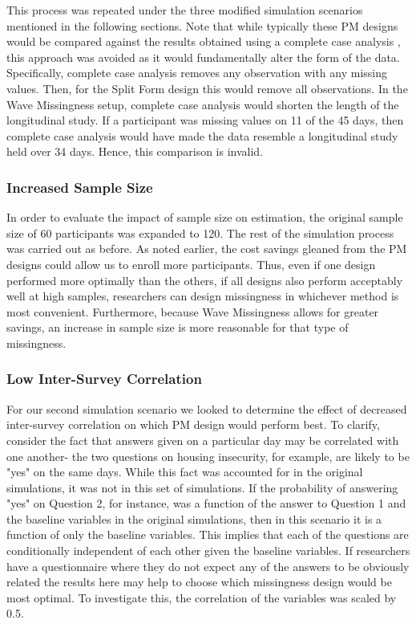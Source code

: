 \documentclass{svjour3}\usepackage[]{graphicx}\usepackage[]{color}
\begin{document}
This process was repeated under the three modified simulation scenarios mentioned in the following sections. Note that while typically these PM designs would be compared against the results obtained using a complete case analysis \citep{rhemtulla2016asymptotic}, this approach was avoided as it would fundamentally alter the form of the data. Specifically, complete case analysis removes any observation with any missing values. Then, for the Split Form design this would remove all observations. In the Wave Missingness setup, complete case analysis would shorten the length of the longitudinal study. If a participant was missing values on 11 of the 45 days, then complete case analysis would have made the data resemble a longitudinal study held over 34 days. Hence, this comparison is invalid. \par

\subsubsection{Increased Sample Size}
In order to evaluate the impact of sample size on estimation, the original sample size of 60 participants was expanded to 120. The rest of the simulation process was carried out as before. As noted earlier, the cost savings gleaned from the PM designs could allow us to enroll more participants. Thus, even if one design performed more optimally than the others, if all designs also perform acceptably well at high samples, researchers can design missingness in whichever method is most convenient. Furthermore, because Wave Missingness allows for greater savings, an increase in sample size is more reasonable for that type of missingness. \par
\subsubsection{Low Inter-Survey Correlation}
For our second simulation scenario we looked to determine the effect of decreased inter-survey correlation on which PM design would perform best. To clarify, consider the fact that answers given on a particular day may be correlated with one another- the two questions on housing insecurity, for example, are likely to be "yes" on the same days. While this fact was accounted for in the original simulations, it was not in this set of simulations. If the probability of answering "yes" on Question 2, for instance, was a function of the answer to Question 1 and the baseline variables in the original simulations, then in this scenario it is a function of only the baseline variables. This implies that each of the questions are conditionally independent of each other given the baseline variables. If researchers have a questionnaire where they do not expect any of the answers to be obviously related the results here may help to choose which missingness design would be most optimal. To investigate this, the correlation of the variables was scaled by 0.5.\par
\end{document}
